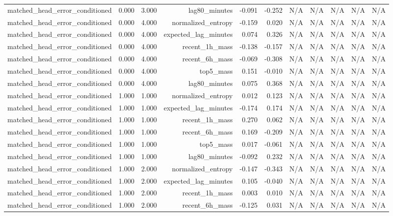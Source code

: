 \begin{table}[h!]
\begin{tabular}{lrrrrrrrrrr}
matched\_head\_error\_conditioned & 0.000 & 3.000 & lag80\_minutes & -0.091 & -0.252 & N/A & N/A & N/A & N/A & N/A \\
matched\_head\_error\_conditioned & 0.000 & 4.000 & normalized\_entropy & -0.159 & 0.020 & N/A & N/A & N/A & N/A & N/A \\
matched\_head\_error\_conditioned & 0.000 & 4.000 & expected\_lag\_minutes & 0.074 & 0.326 & N/A & N/A & N/A & N/A & N/A \\
matched\_head\_error\_conditioned & 0.000 & 4.000 & recent\_1h\_mass & -0.138 & -0.157 & N/A & N/A & N/A & N/A & N/A \\
matched\_head\_error\_conditioned & 0.000 & 4.000 & recent\_6h\_mass & -0.069 & -0.308 & N/A & N/A & N/A & N/A & N/A \\
matched\_head\_error\_conditioned & 0.000 & 4.000 & top5\_mass & 0.151 & -0.010 & N/A & N/A & N/A & N/A & N/A \\
matched\_head\_error\_conditioned & 0.000 & 4.000 & lag80\_minutes & 0.075 & 0.368 & N/A & N/A & N/A & N/A & N/A \\
matched\_head\_error\_conditioned & 1.000 & 1.000 & normalized\_entropy & 0.012 & 0.123 & N/A & N/A & N/A & N/A & N/A \\
matched\_head\_error\_conditioned & 1.000 & 1.000 & expected\_lag\_minutes & -0.174 & 0.174 & N/A & N/A & N/A & N/A & N/A \\
matched\_head\_error\_conditioned & 1.000 & 1.000 & recent\_1h\_mass & 0.270 & 0.062 & N/A & N/A & N/A & N/A & N/A \\
matched\_head\_error\_conditioned & 1.000 & 1.000 & recent\_6h\_mass & 0.169 & -0.209 & N/A & N/A & N/A & N/A & N/A \\
matched\_head\_error\_conditioned & 1.000 & 1.000 & top5\_mass & 0.017 & -0.061 & N/A & N/A & N/A & N/A & N/A \\
matched\_head\_error\_conditioned & 1.000 & 1.000 & lag80\_minutes & -0.092 & 0.232 & N/A & N/A & N/A & N/A & N/A \\
matched\_head\_error\_conditioned & 1.000 & 2.000 & normalized\_entropy & -0.147 & -0.343 & N/A & N/A & N/A & N/A & N/A \\
matched\_head\_error\_conditioned & 1.000 & 2.000 & expected\_lag\_minutes & 0.105 & -0.040 & N/A & N/A & N/A & N/A & N/A \\
matched\_head\_error\_conditioned & 1.000 & 2.000 & recent\_1h\_mass & 0.003 & 0.010 & N/A & N/A & N/A & N/A & N/A \\
matched\_head\_error\_conditioned & 1.000 & 2.000 & recent\_6h\_mass & -0.125 & 0.031 & N/A & N/A & N/A & N/A & N/A \\

\end{tabular}
\end{table}
